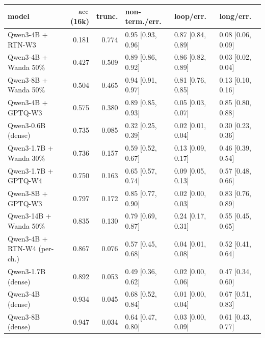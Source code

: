 \begin{tabular}{lrrlll}
\toprule
model & $\mathrm{acc}$ (16k) & trunc. & non-term./err. & loop/err. & long/err. \\
\midrule
Qwen3-4B + RTN-W3 & 0.181 & 0.774 & 0.95 [0.93, 0.96] & 0.87 [0.84, 0.89] & 0.08 [0.06, 0.09] \\
Qwen3-4B + Wanda 50\% & 0.427 & 0.509 & 0.89 [0.86, 0.92] & 0.86 [0.82, 0.89] & 0.03 [0.02, 0.04] \\
Qwen3-8B + Wanda 50\% & 0.504 & 0.465 & 0.94 [0.91, 0.97] & 0.81 [0.76, 0.85] & 0.13 [0.10, 0.16] \\
Qwen3-4B + GPTQ-W3 & 0.575 & 0.380 & 0.89 [0.85, 0.93] & 0.05 [0.03, 0.07] & 0.85 [0.80, 0.88] \\
Qwen3-0.6B (dense) & 0.735 & 0.085 & 0.32 [0.25, 0.39] & 0.02 [0.01, 0.04] & 0.30 [0.23, 0.36] \\
Qwen3-1.7B + Wanda 30\% & 0.736 & 0.157 & 0.59 [0.52, 0.67] & 0.13 [0.09, 0.17] & 0.46 [0.39, 0.54] \\
Qwen3-1.7B + GPTQ-W4 & 0.750 & 0.163 & 0.65 [0.57, 0.74] & 0.09 [0.05, 0.13] & 0.57 [0.48, 0.66] \\
Qwen3-8B + GPTQ-W3 & 0.797 & 0.172 & 0.85 [0.77, 0.90] & 0.02 [0.00, 0.03] & 0.83 [0.76, 0.89] \\
Qwen3-14B + Wanda 50\% & 0.835 & 0.130 & 0.79 [0.69, 0.87] & 0.24 [0.17, 0.31] & 0.55 [0.45, 0.65] \\
Qwen3-4B + RTN-W4 (per-ch.) & 0.867 & 0.076 & 0.57 [0.45, 0.68] & 0.04 [0.01, 0.08] & 0.52 [0.41, 0.64] \\
Qwen3-1.7B (dense) & 0.892 & 0.053 & 0.49 [0.36, 0.62] & 0.02 [0.00, 0.06] & 0.47 [0.34, 0.60] \\
Qwen3-4B (dense) & 0.934 & 0.045 & 0.68 [0.52, 0.84] & 0.01 [0.00, 0.04] & 0.67 [0.51, 0.83] \\
Qwen3-8B (dense) & 0.947 & 0.034 & 0.64 [0.47, 0.80] & 0.03 [0.00, 0.09] & 0.61 [0.43, 0.77] \\
\bottomrule
\end{tabular}
